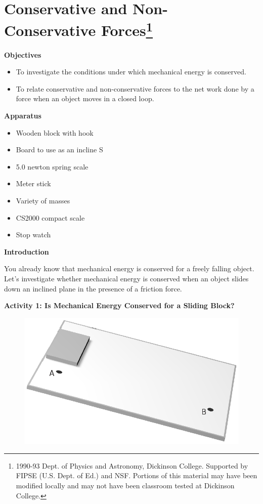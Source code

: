 
\section{Conservative and Non-Conservative Forces\footnote{
1990-93 Dept. of Physics and Astronomy, Dickinson College. Supported by FIPSE
(U.S. Dept. of Ed.) and NSF. Portions of this material may have been modified
locally and may not have been classroom tested at Dickinson College.
}}

\makelabheader %

\medskip
\textbf{Objectives} 

\begin{itemize}[nosep]
\item To investigate the conditions under which mechanical energy is conserved. 
\item To relate conservative and non-conservative forces to the net work done by a
force when an object moves in a closed loop.
\end{itemize}

\medskip
\textbf{Apparatus} 
\begin{itemize}[nosep]
\item Wooden block with hook 
\item Board to use as an incline S
\item 5.0 newton spring scale 
\item Meter stick 
\item Variety of masses 
\item CS2000 compact scale
\item Stop watch
\end{itemize}

\textbf{Introduction }

You already know that mechanical energy is conserved
for a freely falling object. Let's investigate whether mechanical energy is
conserved when an object slides down an inclined plane in the presence of a
friction force.




\textbf{Activity 1: Is Mechanical Energy Conserved for a Sliding Block? }

\begin{figure}

\hspace{\fill}\includegraphics[scale=0.7]{conservative/block_and_ramp.eps}
\end{figure}

